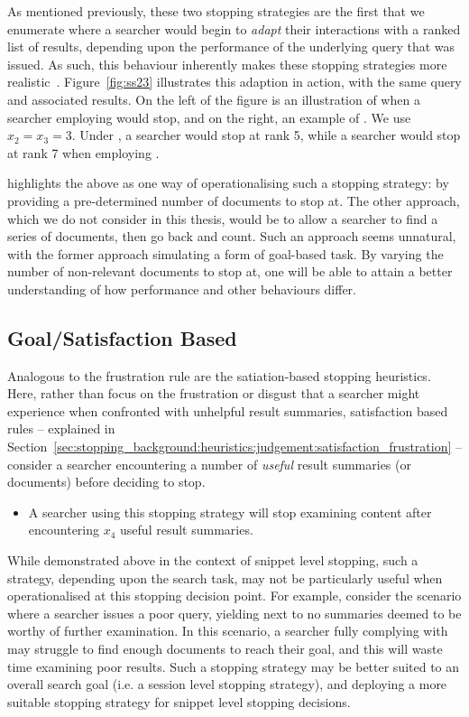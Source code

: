 As mentioned previously, these two stopping strategies are the first that we enumerate where a searcher would begin to \emph{adapt} their interactions with a ranked list of results, depending upon the performance of the underlying query that was issued. As such, this behaviour inherently makes these stopping strategies more realistic~\cite{moffat2013users_versus_models}. Figure~\ref{fig:ss23} illustrates this adaption in action, with the same query and associated results. On the left of the figure is an illustration of when a searcher employing  would stop, and on the right, an example of . We use $x_2 = x_3 = 3$. Under , a searcher would stop at rank 5, while a searcher would stop at rank 7 when employing .

\cite{cooper1973retrieval_effectiveness_ii} highlights the above as one way of operationalising such a stopping strategy: by providing a pre-determined number of documents to stop at. The other approach, which we do not consider in this thesis, would be to allow a searcher to find a series of documents, then go back and count. Such an approach seems unnatural, with the former approach simulating a form of goal-based task. By varying the number of non-relevant documents to stop at, one will be able to attain a better understanding of how performance and other behaviours differ.

\subsection{Goal/Satisfaction Based}
Analogous to the frustration rule are the satiation-based stopping heuristics. Here, rather than focus on the frustration or disgust that a searcher might experience when confronted with unhelpful result summaries, satisfaction based rules -- explained in Section~\ref{sec:stopping_background:heuristics:judgement:satisfaction_frustration} -- consider a searcher encountering a number of \emph{useful} result summaries (or documents) before deciding to stop.

\begin{itemize}
    \item[\blueboxbold{SS4}] A searcher using this stopping strategy will stop examining content after encountering $x_4$ useful result summaries.
\end{itemize}

While demonstrated above in the context of snippet level stopping, such a strategy, depending upon the search task, may not be particularly useful when operationalised at this stopping decision point. For example, consider the scenario where a searcher issues a poor query, yielding next to no summaries deemed to be worthy of further examination. In this scenario, a searcher fully complying with  may struggle to find enough documents to reach their goal, and this will waste time examining poor results. Such a stopping strategy may be better suited to an overall search goal (i.e. a session level stopping strategy), and deploying a more suitable stopping strategy for snippet level stopping decisions.

